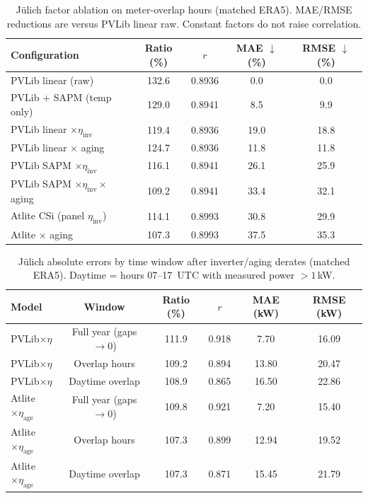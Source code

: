 \documentclass[preprint,12pt,number]{elsarticle}
\begin{document}
\begin{table}[htbp]
\caption{%
Jülich factor ablation on meter-overlap hours (matched ERA5).
MAE/RMSE reductions are versus PVLib linear raw.
Constant factors do not raise correlation.\label{tab_juelich_ablation}
}

\begin{tabularx}{\textwidth}{lCCCC}
\toprule
\textbf{Configuration} & \textbf{Ratio (\%)} & \textbf{$r$} & \textbf{MAE $\downarrow$ (\%)} & \textbf{RMSE $\downarrow$ (\%)}\\
\midrule
PVLib linear (raw) & 132.6 & 0.8936 & 0.0 & 0.0\\
PVLib + SAPM (temp only) & 129.0 & 0.8941 & 8.5 & 9.9\\
PVLib linear $\times\eta_{\mathrm{inv}}$ & 119.4 & 0.8936 & 19.0 & 18.8\\
PVLib linear $\times$ aging & 124.7 & 0.8936 & 11.8 & 11.8\\
PVLib SAPM $\times\eta_{\mathrm{inv}}$ & 116.1 & 0.8941 & 26.1 & 25.9\\
PVLib SAPM $\times\eta_{\mathrm{inv}}\times$ aging & 109.2 & 0.8941 & 33.4 & 32.1\\
Atlite CSi (panel $\eta_{\mathrm{inv}}$) & 114.1 & 0.8993 & 30.8 & 29.9\\
Atlite $\times$ aging & 107.3 & 0.8993 & 37.5 & 35.3\\
\bottomrule
\end{tabularx}
\end{table}

\begin{table}[htbp]
\caption{%
Jülich absolute errors by time window after inverter/aging derates (matched ERA5).
Daytime = hours 07--17~UTC with measured power $>1$\,kW.\label{tab_juelich_windows}
}

\begin{tabularx}{\textwidth}{lCCCCC}
\toprule
\textbf{Model} & \textbf{Window} & \textbf{Ratio (\%)} & \textbf{$r$} & \textbf{MAE (kW)} & \textbf{RMSE (kW)}\\
\midrule
PVLib$\times\eta$ & Full year (gaps$\rightarrow$0) & 111.9 & 0.918 & 7.70 & 16.09\\
PVLib$\times\eta$ & Overlap hours & 109.2 & 0.894 & 13.80 & 20.47\\
PVLib$\times\eta$ & Daytime overlap & 108.9 & 0.865 & 16.50 & 22.86\\
Atlite$\times\eta_{\mathrm{age}}$ & Full year (gaps$\rightarrow$0) & 109.8 & 0.921 & 7.20 & 15.40\\
Atlite$\times\eta_{\mathrm{age}}$ & Overlap hours & 107.3 & 0.899 & 12.94 & 19.52\\
Atlite$\times\eta_{\mathrm{age}}$ & Daytime overlap & 107.3 & 0.871 & 15.45 & 21.79\\
\bottomrule
\end{tabularx}
\end{table}
\end{document}
